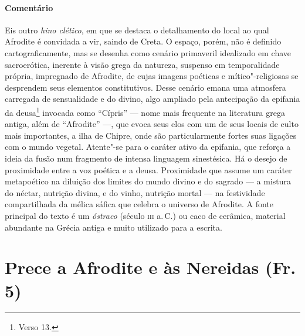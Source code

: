 {\paragraph{Comentário} Eis outro \emph{hino clético}, em que se destaca o detalhamento do local ao
qual Afrodite é convidada a vir, saindo de Creta. O espaço, porém, não é
definido cartograficamente, mas se desenha como cenário primaveril idealizado
em chave sacroerótica, inerente à visão grega da natureza, suspenso em
temporalidade própria, impregnado de Afrodite, de cujas imagens poéticas e
mítico"-religiosas se desprendem seus elementos constitutivos. Desse cenário
emana uma atmosfera carregada de sensualidade e do divino, algo ampliado pela
antecipação da epifania da deusa\footnote{Verso 13.} invocada como ``Cípris'' ---
nome mais frequente na literatura grega antiga, além de ``Afrodite'' ---, que evoca
seus elos com um de seus locais de culto mais importantes, a ilha de Chipre,
onde são particularmente fortes suas ligações com o mundo vegetal. Atente"-se
para o caráter ativo da epifania, que reforça a ideia da fusão num fragmento de intensa linguagem sinestésica. Há o desejo de proximidade
entre a voz poética e a deusa. Proximidade que assume um caráter metapoético na diluição dos limites do mundo divino e do sagrado --- a mistura do néctar, nutrição divina, e do vinho, nutrição mortal --- na festividade compartilhada da mélica sáfica que celebra o universo de Afrodite. A fonte principal do texto é um \emph{óstraco} (século \textsc{iii} a.\,C.) ou caco de cerâmica, material abundante na Grécia antiga e muito utilizado para a
escrita.}

\section{Prece a Afrodite e às Nereidas (Fr.\,5)}

